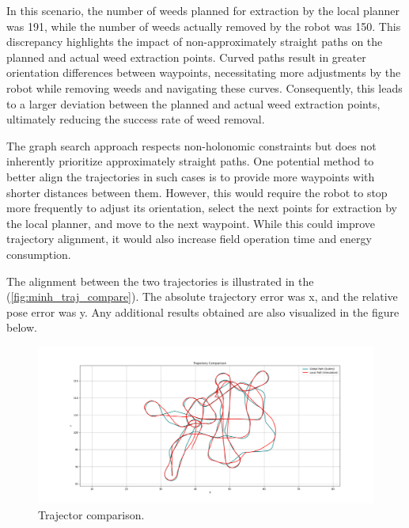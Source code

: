 In this scenario, the number of weeds planned for extraction by the local planner was 191, while the number of weeds actually removed by the robot was 150. This discrepancy highlights the impact of non-approximately straight paths on the planned and actual weed extraction points. Curved paths result in greater orientation differences between waypoints, necessitating more adjustments by the robot while removing weeds and navigating these curves. Consequently, this leads to a larger deviation between the planned and actual weed extraction points, ultimately reducing the success rate of weed removal.

\vspace*{6mm}   

The graph search approach respects non-holonomic constraints but does not inherently prioritize approximately straight paths. One potential method to better align the trajectories in such cases is to provide more waypoints with shorter distances between them. However, this would require the robot to stop more frequently to adjust its orientation, select the next points for extraction by the local planner, and move to the next waypoint. While this could improve trajectory alignment, it would also increase field operation time and energy consumption.


The alignment between the two trajectories is illustrated in the (\autoref{fig:minh_traj_compare}). The absolute trajectory error was x, and the relative pose error was y. Any additional results obtained are also visualized in the figure below.

\begin{figure}[htbp]
    \centering
    \includegraphics[width=\textwidth]{Images/real_robot/minhs_traj_2_better.png} 
    \caption{Trajector comparison.}
    \label{fig:minh_traj_compare}
\end{figure} 


\vspace*{6mm}    


